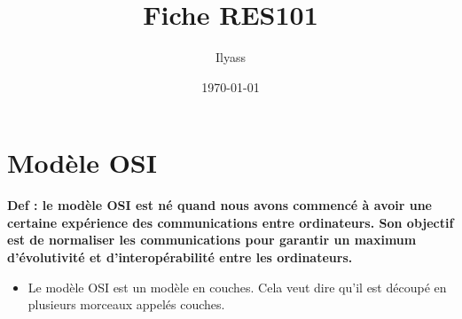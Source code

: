 \documentclass[a4paper,9pt, twocolumn]{article}
\title{\vspace{-1.2cm} Fiche RES101}
\date{\today}
\author{Ilyass \bsc{El Mansouri}}
\begin{document}
\maketitle
\section*{Modèle OSI}
\textbf{Def : le modèle OSI est né quand nous avons commencé à avoir une certaine expérience des communications entre ordinateurs. Son objectif est de normaliser les communications pour garantir un maximum d'évolutivité et d'interopérabilité entre les ordinateurs.}
\begin{itemize}
\item Le modèle OSI est un modèle en couches. Cela veut dire qu'il est découpé en plusieurs morceaux appelés couches.


\end{itemize}
\end{document}
